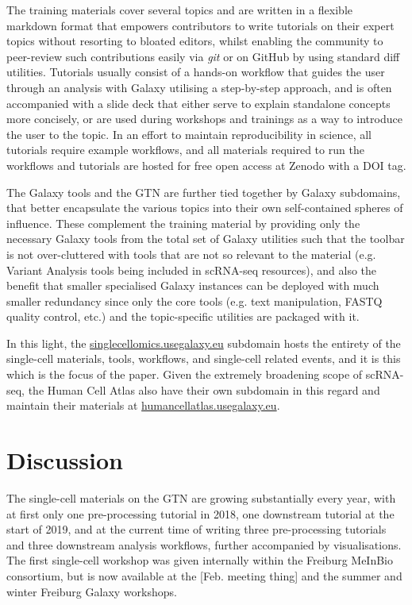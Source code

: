 \documentclass[a4paper,num-refs]{oup-contemporary}
\newcommand{\prog}[1]{\textit{#1}}
\begin{document}
The training materials cover several topics and are written in a flexible markdown format that empowers contributors to write tutorials on their expert topics without resorting to bloated editors, whilst enabling the community to peer-review such contributions easily via \prog{git} or on GitHub by using standard diff utilities. Tutorials usually consist of a hands-on workflow that guides the user through an analysis with Galaxy utilising a step-by-step approach, and is often accompanied with a slide deck that either serve to explain standalone concepts more concisely, or are used during workshops and trainings as a way to introduce the user to the topic. In an effort to maintain reproducibility in science,  all tutorials require example workflows, and all materials required to run the workflows and tutorials are hosted for free open access at Zenodo with a DOI tag.

The Galaxy tools and the GTN are further tied together by Galaxy subdomains, that better encapsulate the various topics into their own self-contained spheres of influence. These complement the training material by providing only the necessary Galaxy tools from the total set of Galaxy utilities such that the toolbar is not over-cluttered with tools that are not so relevant to the material (e.g. Variant Analysis tools being included in scRNA-seq resources), and also the benefit that smaller specialised Galaxy instances can be deployed with much smaller redundancy since only the core tools (e.g. text manipulation, FASTQ quality control, etc.) and the topic-specific utilities are packaged with it.

In this light, the \url{singlecellomics.usegalaxy.eu} subdomain hosts the entirety of the single-cell materials, tools, workflows, and single-cell related events, and it is this which is the focus of the paper. Given the extremely broadening scope of scRNA-seq, the Human Cell Atlas also have their own subdomain in this regard and maintain their materials at \url{humancellatlas.usegalaxy.eu}.


\section{Discussion}

The single-cell materials on the GTN are growing substantially every year, with at first only one pre-processing tutorial in 2018, one downstream tutorial at the start of 2019, and at the current time of writing three pre-processing tutorials and three downstream analysis workflows, further accompanied by visualisations. The first single-cell workshop was given internally within the Freiburg MeInBio consortium, but is now available at the [Feb. meeting thing] and the summer and winter Freiburg Galaxy workshops.
\end{document}
